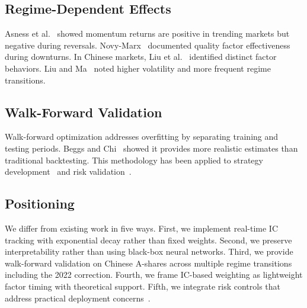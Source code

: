 \subsection{Regime-Dependent Effects}

Asness et al.~\cite{asness2013} showed momentum returns are positive in trending markets but negative during reversals. Novy-Marx~\cite{novy-marx2013} documented quality factor effectiveness during downturns. In Chinese markets, Liu et al.~\cite{liu2019} identified distinct factor behaviors. Liu and Ma~\cite{liu2022review} noted higher volatility and more frequent regime transitions.

\subsection{Walk-Forward Validation}

Walk-forward optimization addresses overfitting by separating training and testing periods. Beggs and Chi~\cite{beggs2018} showed it provides more realistic estimates than traditional backtesting. This methodology has been applied to strategy development~\cite{arnold2019} and risk validation~\cite{prado2018}.

\subsection{Positioning}

We differ from existing work in five ways. First, we implement real-time IC tracking with exponential decay rather than fixed weights. Second, we preserve interpretability rather than using black-box neural networks. Third, we provide walk-forward validation on Chinese A-shares across multiple regime transitions including the 2022 correction. Fourth, we frame IC-based weighting as lightweight factor timing with theoretical support. Fifth, we integrate risk controls that address practical deployment concerns~\cite{demiguel2009,jorion1996,rockafellar2000}.
